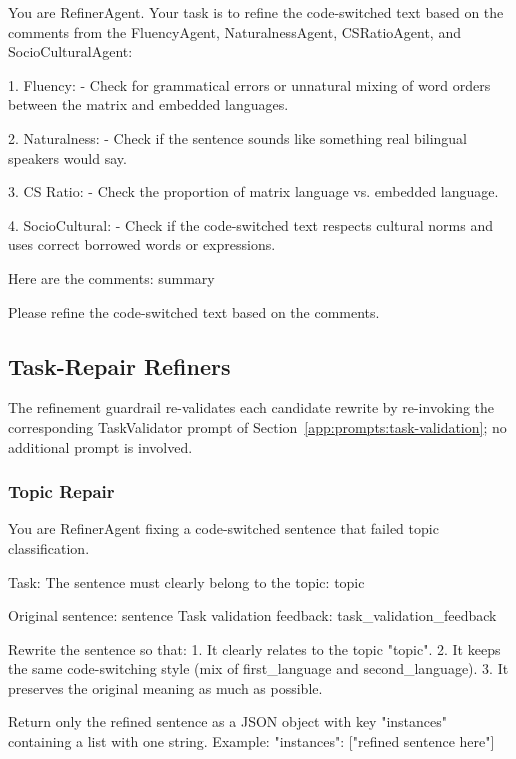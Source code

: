 \begin{Prompt}
You are RefinerAgent. Your task is to refine the code-switched text based on
the comments from the FluencyAgent, NaturalnessAgent, CSRatioAgent, and
SocioCulturalAgent:

1. Fluency:
- Check for grammatical errors or unnatural mixing of word orders between
  the matrix and embedded languages.

2. Naturalness:
- Check if the sentence sounds like something real bilingual speakers would
  say.

3. CS Ratio:
- Check the proportion of matrix language vs. embedded language.

4. SocioCultural:
- Check if the code-switched text respects cultural norms and uses correct
  borrowed words or expressions.

Here are the comments: {summary}

Please refine the code-switched text based on the comments.
\end{Prompt}


\subsection{Task-Repair Refiners}
\label{app:prompt:task-refiners}

The refinement guardrail re-validates each candidate rewrite by re-invoking the
corresponding TaskValidator prompt of
Section~\ref{app:prompts:task-validation}; no additional prompt is involved.

\subsubsection{Topic Repair}

\begin{Prompt}
You are RefinerAgent fixing a code-switched sentence that failed topic
classification.

Task: The sentence must clearly belong to the topic: {topic}

Original sentence: {sentence}
Task validation feedback: {task_validation_feedback}

Rewrite the sentence so that:
1. It clearly relates to the topic "{topic}".
2. It keeps the same code-switching style
   (mix of {first_language} and {second_language}).
3. It preserves the original meaning as much as possible.

Return only the refined sentence as a JSON object with key "instances"
containing a list with one string.
Example: {"instances": ["refined sentence here"]}
\end{Prompt}

